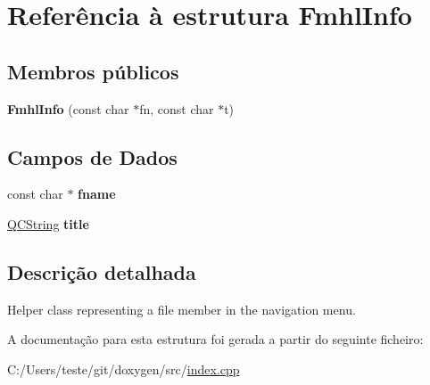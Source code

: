 \hypertarget{struct_fmhl_info}{\section{Referência à estrutura Fmhl\-Info}
\label{struct_fmhl_info}
}
\subsection*{Membros públicos}
\begin{DoxyCompactItemize}
\item 
\hypertarget{struct_fmhl_info_a066b8a17cd24f0601a2a770830d1758b}{{\bfseries Fmhl\-Info} (const char $\ast$fn, const char $\ast$t)}\label{struct_fmhl_info_a066b8a17cd24f0601a2a770830d1758b}

\end{DoxyCompactItemize}
\subsection*{Campos de Dados}
\begin{DoxyCompactItemize}
\item 
\hypertarget{struct_fmhl_info_a6a2fc0c236288b07ce5bd1335ca89fa2}{const char $\ast$ {\bfseries fname}}\label{struct_fmhl_info_a6a2fc0c236288b07ce5bd1335ca89fa2}

\item 
\hypertarget{struct_fmhl_info_a42bb80709d086df855babb087e63794b}{\hyperlink{class_q_c_string}{Q\-C\-String} {\bfseries title}}\label{struct_fmhl_info_a42bb80709d086df855babb087e63794b}

\end{DoxyCompactItemize}


\subsection{Descrição detalhada}
Helper class representing a file member in the navigation menu. 

A documentação para esta estrutura foi gerada a partir do seguinte ficheiro\-:\begin{DoxyCompactItemize}
\item 
C\-:/\-Users/teste/git/doxygen/src/\hyperlink{index_8cpp}{index.\-cpp}\end{DoxyCompactItemize}
